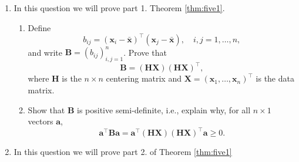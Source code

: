 \documentclass[]{book}
\theoremstyle{definition}
\theoremstyle{definition}
\theoremstyle{definition}
\theoremstyle{remark}
\begin{document}
\begin{enumerate}
\def\labelenumi{\arabic{enumi}.}
\item
  In this question we will prove part 1. Theorem \ref{thm:five1}.

  \begin{enumerate}
  \def\labelenumii{\roman{enumii}.}
  \item
    Define
    \[
    b_{ij}=(\mathbf x_i-\bar{\mathbf x})^\top (\mathbf x_j-\bar{\mathbf x}), \quad i,j=1, \ldots , n,
    \]
    and write \(\mathbf B=(b_{ij})_{i,j=1}^n\). Prove that \[\mathbf B=(\mathbf H\mathbf X)(\mathbf H\mathbf X)^\top,\] where
    \(\mathbf H\) is the \(n \times n\) centering matrix and \(\mathbf X= (\mathbf x_1, \ldots , \mathbf x_n)^\top\) is the data matrix.
  \item
    Show that \(\mathbf B\) is positive semi-definite, i.e., explain why, for
    all \(n \times 1\) vectors \(\mathbf a\),
    \[
    \mathbf a^\top \mathbf B\mathbf a=\mathbf a^\top (\mathbf H\mathbf X) (\mathbf H\mathbf X)^\top \mathbf a\geq 0. 
    \]
  \end{enumerate}
\item
  In this question we will prove part 2. of Theorem \ref{thm:five1}


\end{enumerate}
\end{document}
